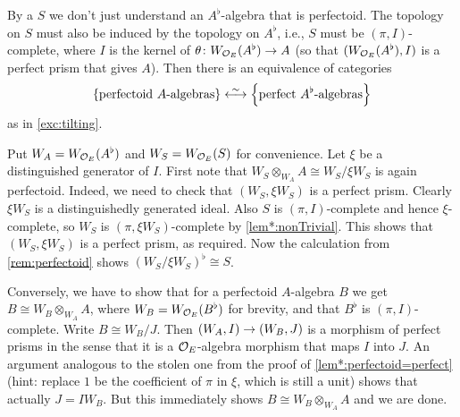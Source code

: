 By a  $S$ we don't just understand an $A^\flat$-algebra that is perfectoid. The topology on $S$ must also be induced by the topology on $A^\flat$, i.e., $S$ must be $(\pi,I)$-complete, where $I$ is the kernel of $\theta\colon W_{\Oo_E}(A^\flat)\morphism A$ (so that $(W_{\mathcal{O}_E}(A^\flat),I)$ is a perfect prism that gives $A$). Then there is an equivalence of categories
\begin{equation*}
	\left\{\text{perfectoid $A$-algebras}\right\}\lrisomorphism \left\{\text{perfect $A^\flat$-algebras}\right\}
\end{equation*}
as in \cref{exc:tilting}.
\begin{proof*}
	Put $W_A=W_{\mathcal{O}_E}(A^\flat)$ and $W_S=W_{\mathcal{O}_E}(S)$ for convenience. Let $\xi$ be a distinguished generator of $I$. First note that $W_S\otimes_{W_A}A\cong W_S/\xi W_S$ is again perfectoid. Indeed, we need to check that $(W_S,\xi W_S)$ is a perfect prism. Clearly $\xi W_S$ is a distinguishedly generated ideal. Also $S$ is $(\pi,I)$-complete and hence $\xi$-complete, so $W_S$ is $(\pi,\xi W_S)$-complete by \cref{lem*:nonTrivial}. This shows that $(W_S,\xi W_S)$ is a perfect prism, as required. Now the calculation from \cref{rem:perfectoid} shows $(W_S/\xi W_S)^\flat\cong S$.
	
	Conversely, we have to show that for a perfectoid $A$-algebra $B$ we get $B\cong W_B\otimes_{W_A} A$, where $W_B=W_{\mathcal{O}_E}(B^\flat)$ for brevity, and that $B^\flat$ is $(\pi,I)$-complete. Write $B\cong W_B/J$. Then  $(W_A,I)\morphism (W_B,J)$ is a morphism of perfect prisms in the sense that it is a $\mathcal{O}_E$-algebra morphism that maps $I$ into $J$. An argument analogous to the stolen one from the proof of \cref{lem*:perfectoid=perfect} (hint: replace $1$ be the coefficient of $\pi$ in $\xi$, which is still a unit) shows that actually $J=IW_B$. But this immediately shows $B\cong W_B\otimes_{W_A}A$ and we are done.
\end{proof*}

